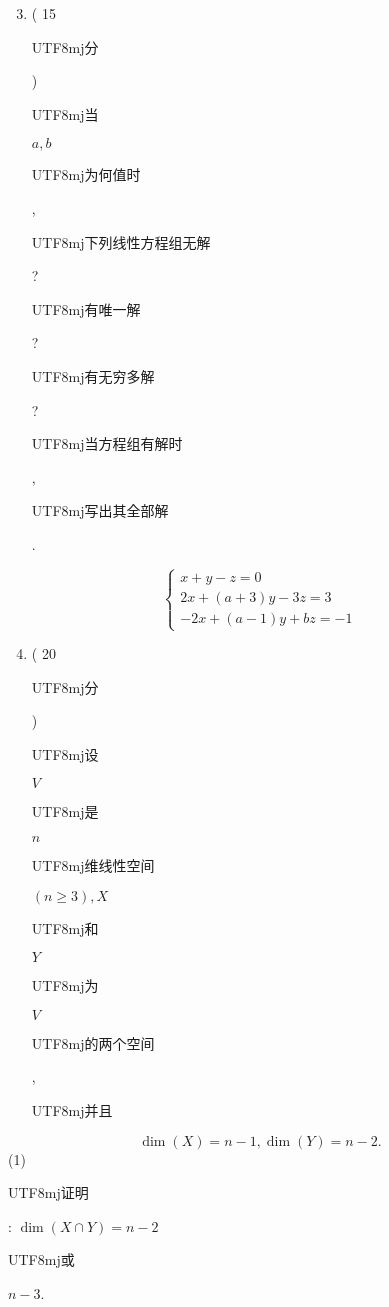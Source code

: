 \documentclass[10pt]{article}
\begin{document}
\begin{enumerate}
  \setcounter{enumi}{2}
  \item ( 15 \begin{CJK}{UTF8}{mj}分\end{CJK}) \begin{CJK}{UTF8}{mj}当\end{CJK} $a, b$ \begin{CJK}{UTF8}{mj}为何值时\end{CJK}, \begin{CJK}{UTF8}{mj}下列线性方程组无解\end{CJK}? \begin{CJK}{UTF8}{mj}有唯一解\end{CJK}? \begin{CJK}{UTF8}{mj}有无穷多解\end{CJK}? \begin{CJK}{UTF8}{mj}当方程组有解时\end{CJK}, \begin{CJK}{UTF8}{mj}写出其全部解\end{CJK}.
\end{enumerate}
$$
\left\{\begin{array}{l}
x+y-z=0 \\
2 x+(a+3) y-3 z=3 \\
-2 x+(a-1) y+b z=-1
\end{array}\right.
$$

\begin{enumerate}
  \setcounter{enumi}{3}
  \item ( 20 \begin{CJK}{UTF8}{mj}分\end{CJK}) \begin{CJK}{UTF8}{mj}设\end{CJK} $V$ \begin{CJK}{UTF8}{mj}是\end{CJK} $n$ \begin{CJK}{UTF8}{mj}维线性空间\end{CJK} $(n \geq 3), X$ \begin{CJK}{UTF8}{mj}和\end{CJK} $Y$ \begin{CJK}{UTF8}{mj}为\end{CJK} $V$ \begin{CJK}{UTF8}{mj}的两个空间\end{CJK}, \begin{CJK}{UTF8}{mj}并且\end{CJK}
\end{enumerate}
$$
\operatorname{dim}(X)=n-1, \operatorname{dim}(Y)=n-2 .
$$
(1) \begin{CJK}{UTF8}{mj}证明\end{CJK}: $\operatorname{dim}(X \cap Y)=n-2$ \begin{CJK}{UTF8}{mj}或\end{CJK} $n-3$.
\end{document}
